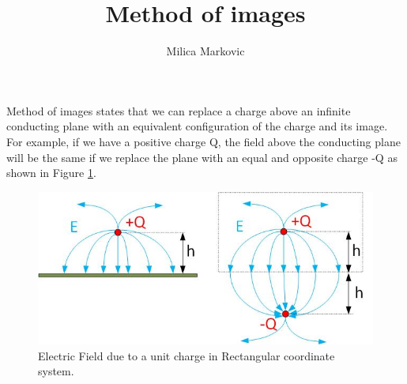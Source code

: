 \documentclass{ximera}
\title{Method of images}
\author{Milica Markovic}
\begin{document}
  
\begin{abstract}  

\end{abstract}  
\maketitle    

   

Method of images states that we can replace a charge above an infinite conducting plane with an equivalent configuration of the charge and its image. For example, if we have a positive charge Q, the field above the conducting plane will be the same if we replace the plane with an equal and opposite charge -Q as shown in Figure \ref{fig:imageMethod}. 





\begin{figure}[htbp]
\begin{center}
\includegraphics[scale=1.8]{../jpg/methodOfImages.jpg}
\end{center}
\caption{Electric Field due to a unit charge in Rectangular coordinate system.}
\label{fig:imageMethod}
\end{figure}
\end{document}
